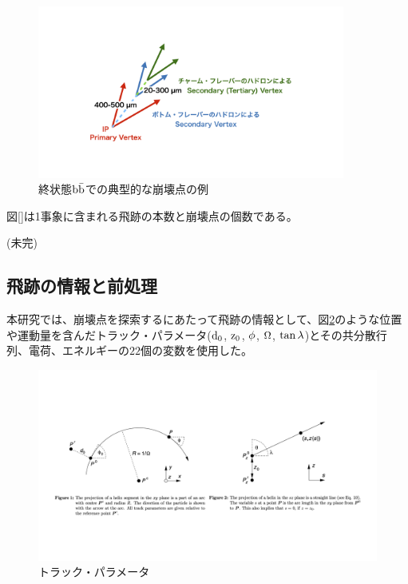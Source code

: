 \begin{figure}[h]
 \centering
 \includegraphics[trim = 0 100 0 50, width=0.9\textwidth]{Figure/3Networks/3-1-1-1FinalStateBB.png}
 \caption{終状態$\rm b\bar{b}$での典型的な崩壊点の例}
 \label{3-1-1-1FinalStateBB}
\end{figure}

図\ref{}は1事象に含まれる飛跡の本数と崩壊点の個数である。

(未完)

\subsection{飛跡の情報と前処理} \label{Net:Data:TrackInformationandPreprocessing}

本研究では、崩壊点を探索するにあたって飛跡の情報として、図\ref{3-1-1-2TrackParameters}のような位置や運動量を含んだトラック・パラメータ($\rm d_0$, $\rm z_0$, $\rm \phi$, $\rm \Omega$, $\rm \tan{\lambda}$)\cite{TrackParametersLCIO}とその共分散行列、電荷、エネルギーの$22$個の変数を使用した。

\begin{figure}[h]
 \centering
 \includegraphics[trim = 0 150 0 150, width=1.0\textwidth]{Figure/3Networks/3-1-1-2TrackParameters.png}
 \caption{トラック・パラメータ\cite{TrackParametersLCIO}}
 \label{3-1-1-2TrackParameters}
\end{figure}

